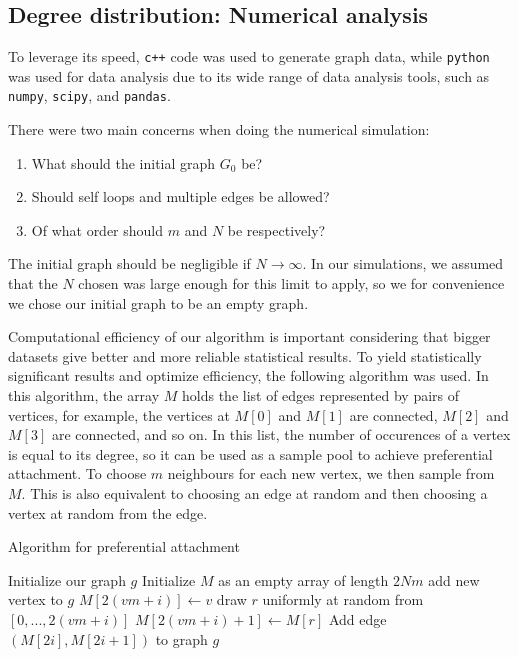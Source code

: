 \subsection{Degree distribution: Numerical analysis}\label{subsection:ppa-numerical-analysis}

To leverage its speed, \texttt{c++} code was used to generate graph data, while \texttt{python} was used for data analysis due to its wide range of data analysis tools, such as \texttt{numpy}, \texttt{scipy}, and \texttt{pandas}. 

There were two main concerns when doing the numerical simulation:

\begin{enumerate}
	\item What should the initial graph $G_0$ be? 
	\item Should self loops and multiple edges be allowed?
	\item Of what order should $m$ and $N$ be respectively?
\end{enumerate}

The initial graph should be negligible if $N \rightarrow \infty$. In our simulations, we assumed that the $N$ chosen was large enough for this limit to apply, so we for convenience we chose our initial graph to be an empty graph. 

Computational efficiency of our algorithm is important considering that bigger datasets give better and more reliable statistical results. To yield statistically significant results and optimize efficiency, the following algorithm was used. In this algorithm, the array $M$ holds the list of edges represented by pairs of vertices, for example, the vertices at $M[0]$ and $M[1]$ are connected, $M[2]$ and $M[3]$ are connected, and so on. In this list, the number of occurences of a vertex is equal to its degree, so it can be used as a sample pool to achieve preferential attachment. To choose $m$ neighbours for each new vertex, we then sample from $M$. This is also equivalent to choosing an edge at random and then choosing a vertex at random from the edge. 

\begin{algorithm}
\caption{Algorithm for preferential attachment}\label{alg:pa}
\begin{algorithmic}[1]
\State Initialize our graph $g$
\State Initialize $M$ as an empty array of length $2Nm$
	\State add new vertex to $g$
		\State $M[2(vm + i)] \gets v$
		\State draw $r$ uniformly at random 
		\State from $[0, ..., 2(vm + i)]$
		\State $M[2(vm + i)+1] \gets M[r]$ 
	\EndFor
\EndFor
\State
{}
	\State Add edge $(M[2i], M[2i+1])$ to graph $g$
\EndFor
\end{algorithmic}
\end{algorithm}

